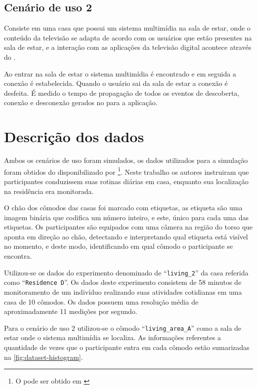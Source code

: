 \subsection{Cenário de uso 2}

Consiste em uma casa que possui um sistema multimídia na sala de estar, onde o conteúdo da televisão se adapta de acordo com os usuários que estão presentes na sala de estar, e a interação com as aplicações da televisão digital acontece através do \smartphone{}.

Ao entrar na sala de estar o sistema multimídia é encontrado e em seguida a conexão é estabelecida. Quando o usuário sai da sala de estar a conexão é desfeita. É medido o tempo de propagação de todos os eventos de descoberta, conexão e desconexão gerados no \stwopa{} para a aplicação.

\section{Descrição dos dados}

Ambos os cenários de uso foram simulados, os dados utilizados para a simulação foram obtidos do \dataset{} disponibilizado por \footnote{O \dataset{} pode ser obtido em \cite{byrne2019dataset}}. Neste trabalho os autores instruiram que participantes conduzissem suas rotinas diárias em casa, enquanto sua localização na residência era monitorada.

O chão dos cômodos das casas foi marcado com etiquetas, as etiqueta são uma imagem binária que codifica um número inteiro, e este, único para cada uma das etiquetas. Os participantes são equipados com uma câmera na região do torso que aponta em direção ao chão, detectando e interpretando qual etiqueta está visível no momento, e deste modo, identificando em qual cômodo o participante se encontra.

Utilizou-se os dados do experimento denominado de ``\texttt{living\_2}'' da casa referida como ``\texttt{Residence D}''. Os dados deste experimento consistem de 58 minutos de monitoramento de um indivíduo realizando suas atividades cotidianas em uma casa de 10 cômodos. Os dados possuem uma resolução média de aproximadamente 11 medições por segundo. 

Para o cenário de uso 2 utilizou-se o cômodo ``\texttt{living\_area\_A}'' como a sala de estar onde o sistema multimídia se localiza. As informações referentes a quantidade de vezes que o participante entra em cada cômodo estão sumarizadas na \autoref{fig:dataset-histogram}.

